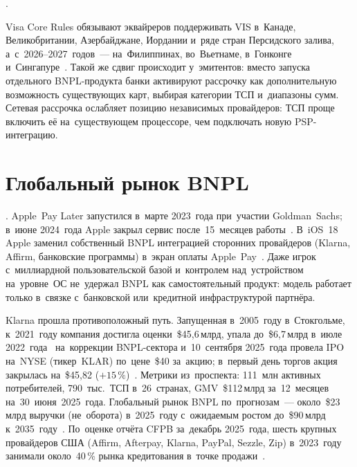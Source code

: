 .

\begin{sloppypar}
  Visa Core Rules обязывают эквайреров поддерживать VIS в~Канаде,
  Великобритании, Азербайджане, Иордании и~ряде стран Персидского залива, а~с~2026--2027~годов~---
  на~Филиппинах, во~Вьетнаме, в~Гонконге и~Сингапуре~\cite{visa-core-rules}.
  Такой же сдвиг происходит у~эмитентов: вместо запуска отдельного
  BNPL-продукта банки активируют рассрочку как дополнительную возможность существующих карт,
  выбирая категории ТСП и~диапазоны сумм. Сетевая рассрочка ослабляет
  позицию независимых провайдеров: ТСП проще включить её на~существующем
  процессоре, чем подключать новую PSP-интеграцию.
\end{sloppypar}

\section{Глобальный рынок BNPL}\label{sec:bnpl-global-market}

. Apple~Pay Later запустился в~марте 2023~года при~участии
Goldman~Sachs; в~июне 2024~года Apple закрыл сервис после~15~месяцев
работы~\cite{apple-pay-later-shutdown}. В~iOS~18 Apple заменил собственный BNPL
интеграцией сторонних провайдеров (Klarna, Affirm, банковские программы)
в~экран оплаты Apple~Pay~\cite{apple-pay-installments-ios18}. Даже игрок
с~миллиардной пользовательской базой и~контролем над~устройством на~уровне~ОС
не~удержал BNPL как самостоятельный продукт: модель работает только в~связке
с~банковской или~кредитной инфраструктурой партнёра.

Klarna прошла противоположный путь. Запущенная в~2005~году в~Стокгольме,
к~2021~году компания достигла оценки~\$45,6\,млрд, упала до~\$6,7\,млрд в~июле
2022~года~\cite{klarna-valuation-2022} на~коррекции BNPL-сектора и~10~сентября 2025~года провела IPO на~NYSE
(тикер~KLAR) по~цене~\$40 за~акцию; в~первый день торгов акция закрылась
на~\$45,82 ($+15\,\%$)~\cite{klarna-ipo-2025}. Метрики из~проспекта:
111~млн активных
потребителей, 790~тыс.\ ТСП в~26~странах, GMV~\$112\,млрд за~12~месяцев
на~30~июня~2025~года. Глобальный рынок BNPL по~прогнозам~--- около~\$23\,млрд
выручки (не~оборота) в~2025~году с~ожидаемым ростом до~\$90\,млрд к~2035~году~\cite{precedence-bnpl-market}. По~оценке отчёта CFPB за~декабрь
2025~года, шесть крупных провайдеров США (Affirm, Afterpay, Klarna, PayPal,
Sezzle, Zip) в~2023~году занимали около~40\,\% рынка кредитования в~точке
продажи~\cite{cfpb-bnpl-2025}.

